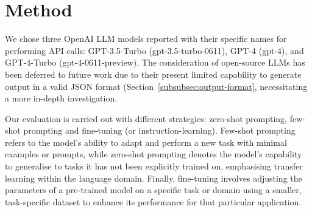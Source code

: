




\section{Method}
\label{sec:method}

We chose three OpenAI LLM models reported with their specific names for performing API calls: GPT-3.5-Turbo (gpt-3.5-turbo-0611), GPT-4 (gpt-4), and GPT-4-Turbo (gpt-4-0611-preview). 
The consideration of open-source LLMs has been deferred to future work due to their present limited capability to generate output in a valid JSON format (Section~\ref{subsubsec:output-format}, necessitating a more in-depth investigation.

Our evaluation is carried out with different strategies: zero-shot prompting, few-shot prompting and fine-tuning (or instruction-learning).  
Few-shot prompting refers to the model's ability to adapt and perform a new task with minimal examples or prompts, while zero-shot prompting denotes the model's capability to generalise to tasks it has not been explicitly trained on, emphasising transfer learning within the language domain.
Finally, fine-tuning involves adjusting the parameters of a pre-trained model on a specific task or domain using a smaller, task-specific dataset to enhance its performance for that particular application.

